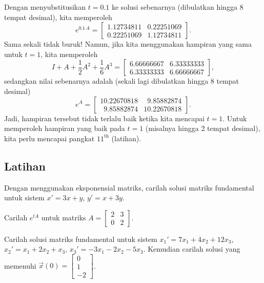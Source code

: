 Dengan menyubstitusikan $t=0.1$ ke solusi sebenarnya (dibulatkan hingga 8 tempat desimal), kita memperoleh
\begin{equation*}
e^{0.1\,A} = 
\begin{bmatrix}
1.12734811 & 0.22251069 \\
0.22251069 & 1.12734811
\end{bmatrix} .
\end{equation*}
Sama sekali tidak buruk!  Namun, jika kita menggunakan hampiran yang sama untuk $t=1$,
kita memperoleh
\begin{equation*}
I + A + \frac{1}{2}A^2 + \frac{1}{6}A^3
=
\begin{bmatrix}
6.66666667 & 6.33333333 \\
6.33333333 & 6.66666667
\end{bmatrix} ,
\end{equation*}
sedangkan nilai sebenarnya adalah (sekali lagi dibulatkan hingga 8 tempat desimal)
\begin{equation*}
e^{A} =
\begin{bmatrix}
10.22670818           & \phantom{0}9.85882874 \\
\phantom{0}9.85882874 & 10.22670818
\end{bmatrix} .
\end{equation*}
Jadi, hampiran tersebut tidak terlalu baik ketika kita mencapai $t=1$.  Untuk memperoleh
hampiran yang baik pada $t=1$ (misalnya hingga 2 tempat desimal), kita perlu mencapai
pangkat ${11}^{\text{th}}$ (latihan).

\subsection{Latihan}

\begin{exercise}
Dengan menggunakan eksponensial matriks,
carilah solusi matriks fundamental untuk sistem
$x' = 3x+y$, $y' = x+3y$.
\end{exercise}

\begin{exercise}
Carilah $e^{tA}$ untuk matriks $A =
\left[ \begin{smallmatrix}
2 & 3 \\
0 & 2
\end{smallmatrix} \right]$.
\end{exercise}

\begin{exercise}
Carilah solusi matriks fundamental untuk sistem
$x_1' = 7x_1+4x_2+ 12x_3$,
$x_2' = x_1+2x_2+x_3$,
$x_3' = -3x_1-2x_2- 5x_3$.  Kemudian carilah solusi yang
memenuhi $\vec{x}(0) = 
\left[ \begin{smallmatrix} 0 \\ 1 \\ -2 \end{smallmatrix} \right]$.
\end{exercise}


